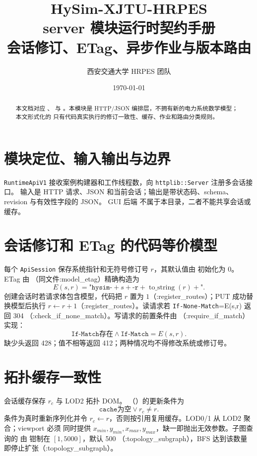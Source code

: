 \documentclass[UTF8,fontset=fandol,a4paper,11pt]{ctexart}
\title{\textbf{HySim-XJTU-HRPES}\\[0.4em]{\Large server 模块运行时契约手册}\\
{\large 会话修订、ETag、异步作业与版本路由}}
\author{西安交通大学 HRPES 团队}
\date{\today}
\begin{document}
\maketitle
\begin{abstract}
本文档对应 、 与
。本模块是 HTTP/JSON 编排层，不拥有新的电力系统数学模型；本文形式化的
只有代码真实执行的修订一致性、缓存、作业和路由分类规则。
\end{abstract}
\tableofcontents

\section{模块定位、输入输出与边界}
\texttt{RuntimeApiV1} 接收案例构建器和工作线程数，向 \texttt{httplib::Server} 注册多会话接口。
输入是 HTTP 请求、JSON 和当前会话；输出是带状态码、schema、revision 与有效性字段的 JSON。
GUI 后端  不属于本目录，二者不能共享会话或缓存。

\section{会话修订和 ETag 的代码等价模型}
每个 \texttt{ApiSession} 保存系统指针和无符号修订号 $r$，其默认值由
 初始化为 0。ETag 由
（同文件:model\_etag）精确构造为
\begin{equation}
E(s,r)=\texttt{"hysim-}+s+\texttt{-r}+\operatorname{to\_string}(r)+\texttt{"}.
\end{equation}
创建会话时若请求体包含模型，代码把 $r$ 置为 $1$（:register\_routes）；PUT 成功替换模型后执行
$r\leftarrow r+1$（:register\_routes）。读请求若 \texttt{If-None-Match}=E(s,r) 返回 304
（:check\_if\_none\_match）。写请求的前置条件由 （:require\_if\_match）实现：
\begin{equation}
\texttt{If-Match存在}\land \texttt{If-Match}=E(s,r).
\end{equation}
缺少头返回 428；值不相等返回 412；两种情况均不得修改系统或修订号。

\section{拓扑缓存一致性}
会话缓存保存 $r_c$ 与 LOD2 拓扑 DOM。
（）的更新条件为
\begin{equation}
\texttt{cache为空}\lor r_c\ne r.
\end{equation}
条件为真时重新序列化并令 $r_c\leftarrow r$，否则按引用复用缓存。LOD0/1 从 LOD2 聚合；viewport 必须
同时提供 $x_{min},y_{min},x_{max},y_{max}$，缺一即抛出无效参数。子图查询的
 由  钳制在 $[1,5000]$，默认 500
（:topology\_subgraph），BFS 达到该数量即停止扩张（:topology\_subgraph）。
\end{document}
